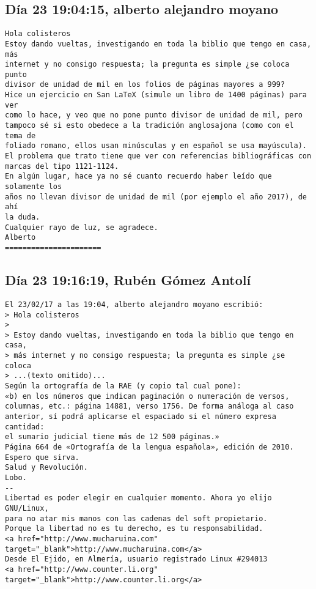 \documentclass[a4paper,10pt]{article}
\begin{document}
\subsection{Día 23 19:04:15, alberto alejandro moyano}

\begin{lstlisting}
Hola colisteros
Estoy dando vueltas, investigando en toda la biblio que tengo en casa, más
internet y no consigo respuesta; la pregunta es simple ¿se coloca punto
divisor de unidad de mil en los folios de páginas mayores a 999?
Hice un ejercicio en San LaTeX (simule un libro de 1400 páginas) para ver
como lo hace, y veo que no pone punto divisor de unidad de mil, pero
tampoco sé si esto obedece a la tradición anglosajona (como con el tema de
foliado romano, ellos usan minúsculas y en español se usa mayúscula).
El problema que trato tiene que ver con referencias bibliográficas con
marcas del tipo 1121-1124.
En algún lugar, hace ya no sé cuanto recuerdo haber leído que solamente los
años no llevan divisor de unidad de mil (por ejemplo el año 2017), de ahí
la duda.
Cualquier rayo de luz, se agradece.
Alberto
======================

\end{lstlisting}

\subsection{Día 23 19:16:19, Rubén Gómez Antolí}

\begin{lstlisting}
El 23/02/17 a las 19:04, alberto alejandro moyano escribió:
> Hola colisteros
> 
> Estoy dando vueltas, investigando en toda la biblio que tengo en casa,
> más internet y no consigo respuesta; la pregunta es simple ¿se coloca
> ...(texto omitido)...
Según la ortografía de la RAE (y copio tal cual pone):
«b) en los números que indican paginación o numeración de versos,
columnas, etc.: página 14881, verso 1756. De forma análoga al caso
anterior, sí podrá aplicarse el espaciado si el número expresa cantidad:
el sumario judicial tiene más de 12 500 páginas.»
Página 664 de «Ortografía de la lengua española», edición de 2010.
Espero que sirva.
Salud y Revolución.
Lobo.
-- 
Libertad es poder elegir en cualquier momento. Ahora yo elijo GNU/Linux,
para no atar mis manos con las cadenas del soft propietario.
Porque la libertad no es tu derecho, es tu responsabilidad.
<a href="http://www.mucharuina.com" target="_blank">http://www.mucharuina.com</a>
Desde El Ejido, en Almería, usuario registrado Linux #294013
<a href="http://www.counter.li.org" target="_blank">http://www.counter.li.org</a>

\end{lstlisting}
\end{document}
